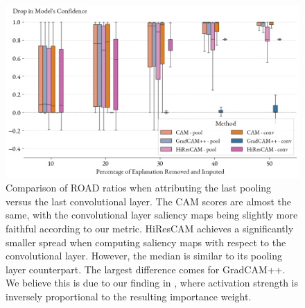 \begin{figure}
    \begin{center}
    \begin{minipage}{1\textwidth}
      \includegraphics[width=\textwidth]{img/road-conv-vs-pool.png}
    \end{minipage}
    \caption{
    Comparison of ROAD ratios when attributing the last pooling versus the last convolutional layer.
    The CAM scores are almost the same, with the convolutional layer saliency maps being slightly more faithful according to our metric.
    HiResCAM achieves a significantly smaller spread when computing saliency maps with respect to the convolutional layer.
    However, the median is similar to its pooling layer counterpart.
    The largest difference comes for GradCAM++.
    We believe this is due to our finding in , where activation strength is inversely proportional to the resulting importance weight.
    }
    \label{fig:road-conv-vs-pool}
    \end{center}
\end{figure}

